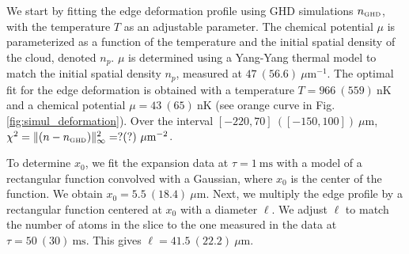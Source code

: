 \documentclass[submission, Phys]{SciPost}
\begin{document}
		We start by fitting the edge deformation profile using GHD simulations $n_{\mbox{\tiny GHD}}$, with the temperature $T$ as an adjustable parameter. The chemical potential $\mu$ is parameterized as a function of the temperature and the initial spatial density of the cloud, denoted $n_p$. $\mu$ is determined using a Yang-Yang thermal model to match the initial spatial density $n_p$, measured at $47~(56.6)~\mu \text{m}^{-1}$. The optimal fit for the edge deformation is obtained with a temperature $T = 966~(559)~\text{nK}$ and a chemical potential $\mu = 43~(65)~\text{nK}$ (see orange curve in Fig. \ref{fig:simul_deformation}). Over the interval $[-220, 70]~([-150, 100])~\mu \mbox{m}$, $\chi^2 = \Vert (n - n_{\mbox{\tiny GHD}})\Vert^2_\infty  = ? (?) ~ \mu \text{m}^{-2} $.

		
		To determine $x_0$, we fit the expansion data at $\tau = 1~\text{ms}$ with a model of a rectangular function convolved with a Gaussian, where $x_0$ is the center of the function. We obtain $x_0 = 5.5~(18.4)~\mu \text{m}$. Next, we multiply the edge profile by a rectangular function centered at $x_0$ with a diameter $\ell$. We adjust $\ell$ to match the number of atoms in the slice to the one measured in the data at $\tau = 50~(30)~\text{ms}$. This gives $\ell = 41.5~(22.2)~\mu \text{m}$.
\end{document}
